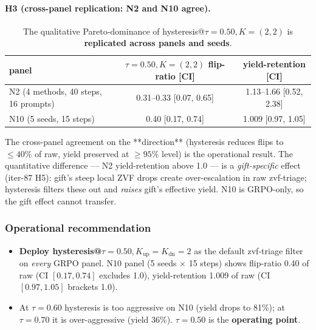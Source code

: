 \documentclass{article}
\begin{document}
\paragraph{H3 (cross-panel replication: N2 and N10 agree).}

\begin{table}[h]
\centering
\small
\begin{tabular}{lcc}
\toprule
panel & $\tau=0.50, K=(2,2)$ flip-ratio [CI] & yield-retention [CI] \\
\midrule
N2 (4 methods, 40 steps, 16 prompts) & 0.31--0.33 [0.07, 0.65] & 1.13--1.66 [0.52, 2.38] \\
N10 (5 seeds, 15 steps)             & 0.40 [0.17, 0.74]      & 1.009 [0.97, 1.05] \\
\bottomrule
\end{tabular}
\caption{The qualitative Pareto-dominance of hysteresis@$\tau{=}0.50,
K{=}(2,2)$ is \textbf{replicated across panels and seeds}.}
\label{tab:p7-hyst-cross-panel}
\end{table}

The cross-panel agreement on the **direction** (hysteresis reduces flips
to $\le 40\%$ of raw, yield preserved at $\ge 95\%$ level) is the
operational result. The quantitative difference — N2 yield-retention
above 1.0 — is a \emph{gift-specific} effect (iter-87 H5): gift's steep
local ZVF drops create over-escalation in raw zvf-triage; hysteresis
filters these out and \emph{raises} gift's effective yield. N10 is
GRPO-only, so the gift effect cannot transfer.

\subsubsection{Operational recommendation}
\begin{itemize}
\item \textbf{Deploy hysteresis@$\tau{=}0.50, K_\text{up}{=}K_\text{dn}{=}2$}
      as the default zvf-triage filter on \emph{every} GRPO panel.
      N10 panel (5 seeds × 15 steps) shows flip-ratio 0.40 of raw
      (CI $[0.17, 0.74]$ excludes 1.0), yield-retention 1.009 of raw
      (CI $[0.97, 1.05]$ brackets 1.0).
\item At $\tau = 0.60$ hysteresis is too aggressive on N10 (yield drops
      to 81\%); at $\tau = 0.70$ it is over-aggressive (yield 36\%).
      $\tau = 0.50$ is the \textbf{operating point}.
\end{itemize}
\end{document}
